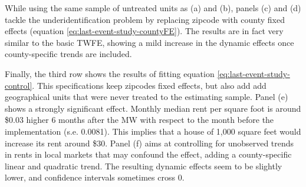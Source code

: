     While using the same sample of untreated units as (a) and (b), panels (c) and (d) tackle the underidentification problem by replacing zipcode with county fixed effects (equation \eqref{eq:last-event-study-countyFE}). The results are in fact very similar to the basic TWFE, showing a mild increase in the dynamic effects once county-specific trends are included. 
    
    Finally, the third row shows the results of fitting equation \eqref{eq:last-event-study-control}. This specifications keep zipcodes fixed effects, but also add add geographical units that were never treated to the estimating sample. Panel (e) shows a strongly significant effect. Monthly median rent per square foot is around \$0.03 higher 6 months after the MW with respect to the month before the implementation (s.e. 0.0081). This implies that a house of 1,000 square feet would increase its rent around \$30.
    Panel (f) aims at controlling for unobserved trends in rents in local markets that may confound the effect, adding a county-specific linear and quadratic trend. The resulting dynamic effects seem to be slightly lower, and confidence intervals sometimes cross 0. 
    
